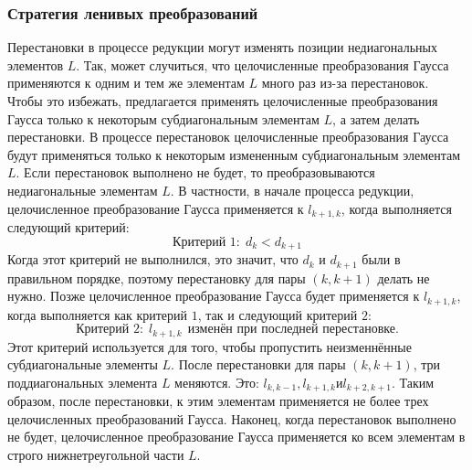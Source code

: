 \documentclass[12pt]{matmex-diploma}
\begin{document}
\subsubsection{Стратегия ленивых преобразований}
Перестановки в процессе редукции могут изменять позиции недиагональных
элементов $L$. Так, может случиться, что целочисленные преобразования 
Гаусса применяются к одним и тем же элементам $L$ много раз из-за перестановок.
Чтобы это избежать, предлагается применять целочисленные преобразования Гаусса
только к некоторым субдиагональным элементам $L$, а затем делать перестановки.
В процессе перестановок целочисленные преобразования Гаусса будут применяться
только к некоторым измененным субдиагональным элементам $L$. Если перестановок
выполнено не будет, то преобразовываются недиагональные элементам $L$.
В частности, в начале процесса редукции, целочисленное преобразование Гаусса
применяется к $l_{k + 1, k}$, когда выполняется следующий критерий:
\begin{equation}
     \text{Критерий 1:} \ \ d_k < d_{k+1}
     \label{eq:26}
\end{equation}
Когда этот критерий не выполнился, это значит, что $d_k$ и $d_{k + 1}$ были в
правильном порядке, поэтому перестановку для пары $(k, k + 1)$ делать не нужно.
Позже целочисленное преобразование Гаусса будет применяется к $l_{k + 1, k}$,
когда выполняется как критерий $1$, так и следующий критерий $2$:
\begin{equation}
     \text{Критерий 2:} \ \ l_{k+1,k} \ \ \text{изменён при последней перестановке}.
     \label{eq:27}
\end{equation}
Этот критерий используется для того, чтобы пропустить неизменнённые субдиагональные
элементы $L$. После перестановки для пары $(k, k + 1)$, три поддиагональных элемента
$L$ меняются. Это: $l_{k, k − 1}, l_{k + 1, k} и l_{k + 2, k + 1}$. Таким образом,
после перестановки, к этим элементам применяется не более трех целочисленных
преобразований Гаусса. Наконец, когда перестановок выполнено не будет,
целочисленное преобразование Гаусса применяется ко всем элементам в строго
нижнетреугольной части $L$.
\end{document}
